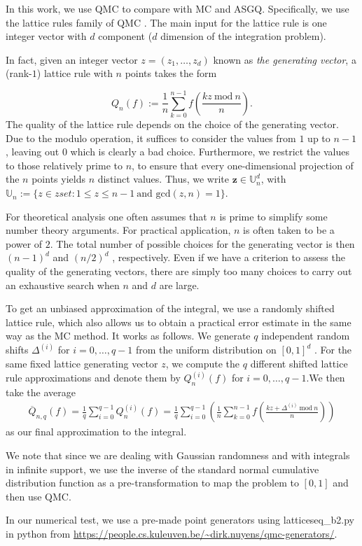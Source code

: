 In this work, we use QMC to compare with MC and ASGQ. Specifically, we use the lattice rules family of QMC \cite{sloan1985lattice,cools2008belgian,nuyens2014construction}.  The main input for the lattice rule is one integer vector with $d$ component ($d$ dimension of the integration problem).

In fact, given an integer vector $z = (z_1,\dots, z_d)$ known as \textit{the generating vector}, a (rank-$1$) lattice rule with $n$ points takes the form

\begin{equation}
Q_n(f):=\frac{1}{n}\sum_{k=0}^{n-1} f \left( \frac{kz \: \text{mod}\: n}{n}\right).
\end{equation}
The quality of the lattice rule depends on the choice of the generating vector. Due to the modulo operation, it suffices to consider the values from $1$ up to $n-1$, leaving out $0$ which is clearly a bad choice. Furthermore, we restrict the values to those relatively prime to $n$, to ensure that every one-dimensional projection of the $n$ points yields $n$ distinct values. Thus, we write $\mathbf{z} \in \mathbb{U}_n^d$, with $\mathbb{U}_n:=\{z \in zset: 1 \le z \le n-1\: \text{and gcd}(z,n)=1\}$.

For theoretical analysis one often assumes that $n$ is prime to simplify some
number theory arguments. For practical application,  $n$ is often taken  to be a power of $2$. The total number of possible choices for the generating vector is then $(n-1)^d$ and $(n/2)^d$ , respectively. Even if we have a criterion to assess the quality of the generating vectors, there are simply too many choices to carry out an exhaustive search when $n$ and $d$ are large. 


To get an unbiased approximation of the integral, we use  a randomly shifted lattice rule, which also allows us to obtain a practical error estimate in the same way as the MC method. It works as follows. We generate $q$ independent random shifts $\Delta^{(i)}$ for $i=0,\dots,q-1$ from the uniform distribution on $[0,1]^d$ . For the same fixed lattice generating vector $z$, we compute the $q$ different shifted lattice rule approximations and denote
them by $Q^{(i )}_n(f)$ for $i=0,\dots,q-1$.We then take the average
\begin{align}
\overline{Q}_{n,q}(f)=\frac{1}{q} \sum_{i=0}^{q-1}Q^{(i )}_n(f)=\frac{1}{q}\sum_{i=0}^{q-1}\left(\frac{1}{n}\sum_{k=0}^{n-1} f \left( \frac{kz+\Delta^{(i)}  \: \text{mod}\: n}{n}\right)  \right)
\end{align}
as our final approximation to the integral.

We note that since we are dealing with Gaussian randomness and with integrals in infinite support, we use the inverse of the standard normal cumulative distribution function as a pre-transformation to map the problem to $[0,1]$ and then use QMC.

In our numerical test, we use a pre-made point generators using latticeseq\_b2.py in python from   \url{https://people.cs.kuleuven.be/~dirk.nuyens/qmc-generators/}.



